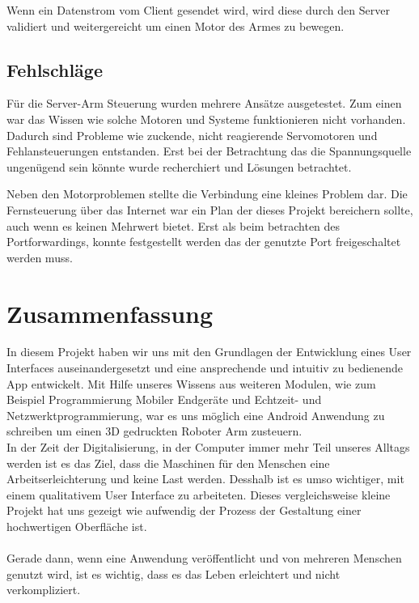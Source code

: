 \documentclass[12pt,					%
							 oneside,			%
							 a4paper,			%
							 halfparskip,		%
							 liststotoc,			%
							 bibtotoc,			%
							 fleqn,				%
							 pointlessnumbers]	%
							 {scrreprt}
\begin{document}
Wenn ein Datenstrom vom Client gesendet wird, wird diese durch den Server validiert und weitergereicht um einen Motor des Armes zu bewegen.


\section{Fehlschläge}
Für die Server-Arm Steuerung wurden mehrere Ansätze ausgetestet. Zum einen war das Wissen wie solche Motoren und Systeme funktionieren nicht vorhanden. Dadurch sind Probleme wie zuckende, nicht reagierende Servomotoren und Fehlansteuerungen entstanden. Erst bei der Betrachtung das die Spannungsquelle ungenügend sein könnte wurde recherchiert\cite{I2C} und Lösungen betrachtet. 

Neben den Motorproblemen stellte die Verbindung eine kleines Problem dar. Die Fernsteuerung über das Internet war ein Plan der dieses Projekt bereichern sollte, auch wenn es keinen Mehrwert bietet. Erst als beim betrachten des Portforwardings, konnte festgestellt werden das der genutzte Port freigeschaltet werden muss.
\chapter{Zusammenfassung}	
In diesem Projekt haben wir uns mit den Grundlagen der Entwicklung eines User Interfaces auseinandergesetzt und eine ansprechende und intuitiv zu bedienende App entwickelt. Mit Hilfe unseres Wissens aus weiteren Modulen, wie zum Beispiel \glqq{}Programmierung Mobiler Endgeräte\grqq{} und \glqq{}Echtzeit- und Netzwerktprogrammierung\grqq{}, war es uns möglich eine Android Anwendung zu schreiben um einen 3D gedruckten Roboter Arm zusteuern. 
\\
In der Zeit der Digitalisierung, in der Computer immer mehr Teil unseres Alltags werden ist es das Ziel, dass die Maschinen für den Menschen eine Arbeitserleichterung und keine Last werden. Desshalb ist es umso wichtiger, mit einem qualitativem User Interface zu arbeiteten. Dieses vergleichsweise kleine Projekt hat uns gezeigt wie aufwendig der Prozess der Gestaltung einer hochwertigen Oberfläche ist.\\ \\
Gerade dann, wenn eine Anwendung veröffentlicht und von mehreren Menschen genutzt wird, ist es wichtig, dass es das Leben erleichtert und nicht verkompliziert.

\end{document}
